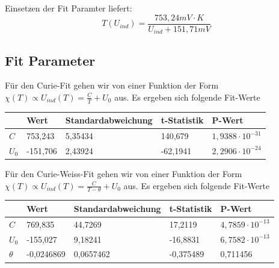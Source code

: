 \documentclass[bigchapter,colorback,accentcolor=tud4b,linedtoc,11pt]{tudreport}
\begin{document}
Einsetzen der Fit Paramter liefert:
$$T(U_{ind}) = \frac{753,24mV \cdot K}{U_{ind}+151,71mV}$$ 


\subsection{Fit Parameter}
Für den Curie-Fit gehen wir von einer Funktion der Form $\chi(T) \propto U_{ind}(T)
= \frac{C}{T} + U_0$ aus.
Es ergeben sich folgende Fit-Werte
\begin{center}
  \begin{tabular}{l|llll}
    \text{} & Wert     & Standardabweichung & t-Statistik & P-Wert                  \\ \hline
    $C  $   & 753,243  & 5,35434            & 140,679     & $1,9388 \cdot 10^{-31}$ \\
    $U_0$   & -151,706 & 2,43924            & -62,1941    & $2,2906 \cdot 10^{-24}$ \\
  \end{tabular}
\end{center}


Für den Curie-Weiss-Fit gehen wir von einer Funktion der Form $\chi(T) \propto
U_{ind}(T) = \frac{C}{T-\theta} + U_0$ aus.
Es ergeben sich folgende Fit-Werte
\begin{center}
  \begin{tabular}{l|llll}
             & Wert       & Standardabweichung & t-Statistik & P-Wert                  \\ \hline
    $C     $ & 769,835    & 44,7269            & 17,2119     & $4,7859 \cdot 10^{-13}$ \\
    $U_0   $ & -155,027   & 9,18241            & -16,8831    & $6,7582 \cdot 10^{-13}$ \\
    $\theta$ & -0,0246869 & 0,0657462          & -0,375489   & 0,711456                \\
  \end{tabular}
\end{center}
\end{document}
